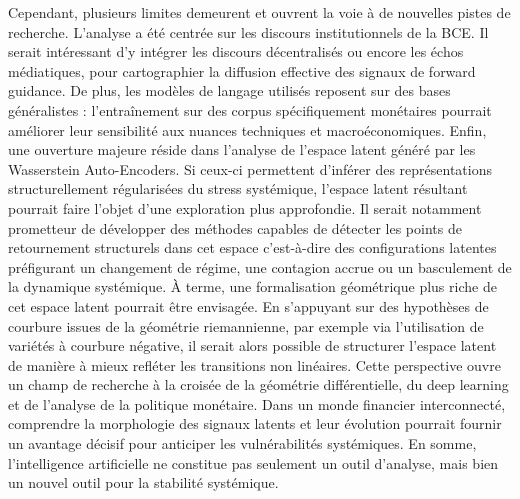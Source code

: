 Cependant, plusieurs limites demeurent et ouvrent la voie à de nouvelles pistes de recherche. L’analyse a été centrée sur les discours institutionnels de la BCE. Il serait intéressant d’y intégrer les discours décentralisés ou encore les échos médiatiques, pour cartographier la diffusion effective des signaux de forward guidance. De plus, les modèles de langage utilisés reposent sur des bases généralistes : l'entraînement sur des corpus spécifiquement monétaires pourrait améliorer leur sensibilité aux nuances techniques et macroéconomiques. Enfin, une ouverture majeure réside dans l’analyse de l’espace latent généré par les Wasserstein Auto-Encoders. Si ceux-ci permettent d’inférer des représentations structurellement régularisées du stress systémique, l’espace latent résultant pourrait faire l’objet d’une exploration plus approfondie. Il serait notamment prometteur de développer des méthodes capables de détecter les points de retournement structurels dans cet espace c’est-à-dire des configurations latentes préfigurant un changement de régime, une contagion accrue ou un basculement de la dynamique systémique. À terme, une formalisation géométrique plus riche de cet espace latent pourrait être envisagée. En s'appuyant sur des hypothèses de courbure issues de la géométrie riemannienne, par exemple via l’utilisation de variétés à courbure négative, il serait alors possible de structurer l’espace latent de manière à mieux refléter les transitions non linéaires. Cette perspective ouvre un champ de recherche à la croisée de la géométrie différentielle, du deep learning et de l’analyse de la politique monétaire. Dans un monde financier interconnecté, comprendre la morphologie des signaux latents et leur évolution pourrait fournir un avantage décisif pour anticiper les vulnérabilités systémiques. En somme, l’intelligence artificielle ne constitue pas seulement un outil d’analyse, mais bien un nouvel outil pour la stabilité systémique.\\

